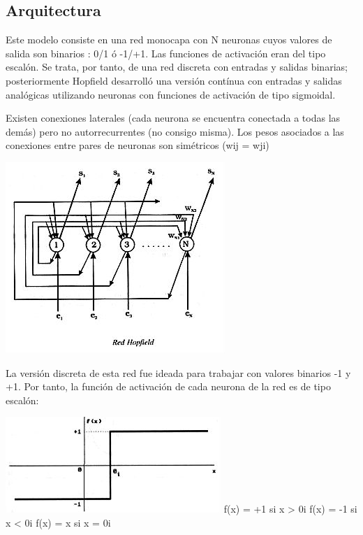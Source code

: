 \documentclass[letterpaper,12pt]{article}
\begin{document}
\subsection{Arquitectura}

Este modelo consiste en una red monocapa con N neuronas cuyos valores de salida son binarios : 0/1 ó -1/+1. Las funciones de activación eran del tipo escalón. Se trata, por tanto, de una red discreta con entradas y salidas binarias; posteriormente Hopfield desarrolló una versión contínua con entradas y salidas analógicas utilizando neuronas con funciones de activación de tipo sigmoidal.

Existen conexiones laterales (cada neurona se encuentra conectada a todas las demás) pero no autorrecurrentes (no consigo misma). Los pesos asociados a las conexiones entre pares de neuronas son simétricos (wij = wji)

\begin{center}
    \includegraphics[scale = 0.5]{Imagenes/Arquitectura_Hopfield.jpg}
\end{center}

La versión discreta de esta red fue ideada para trabajar con valores binarios -1 y +1. Por tanto, la función de activación de cada neurona de la red es de tipo escalón:

\begin{center}
    \includegraphics[scale = 0.5]{Imagenes/Arquitectura2_Hopfield.jpg}\newline
f(x) = +1 si x > 0i\newline
f(x) = -1 si x < 0i\newline
f(x) = x si x = 0i\newline
\end{center}
\end{document}
